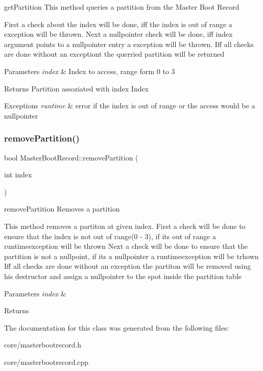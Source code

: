 get\+Partition This method queries a partition from the Master Boot Record 

First a check about the index will be done, iff the index is out of range a exception will be thrown. Next a nullpointer check will be done, iff index argument points to a nullpointer entry a exception will be thrown. Iff all checks are done without an exceptiont the querried partition will be returned 
\begin{DoxyParams}{Parameters}
{\em index} & Index to access, range form 0 to 3 \\
\hline
\end{DoxyParams}
\begin{DoxyReturn}{Returns}
Partition assoziated with index Index 
\end{DoxyReturn}

\begin{DoxyExceptions}{Exceptions}
{\em runtime} & error if the index is out of range or the access would be a nullpointer \\
\hline
\end{DoxyExceptions}
\mbox{\label{classcore_1_1disk_1_1_master_boot_record_af155df4b9738c217678a8f875e679c50}} 
\subsubsection{\texorpdfstring{remove\+Partition()}{removePartition()}}
{\footnotesize\ttfamily bool Master\+Boot\+Record\+::remove\+Partition (\begin{DoxyParamCaption}\item[{int}]{index }\end{DoxyParamCaption})}



remove\+Partition Removes a partition 

This method removes a partiton at given index. First a check will be done to ensure that the index is not out of range(0 -\/ 3), if its out of range a runtimeexception will be thrown Next a check will be done to ensure that the partition is not a nullpoint, if its a nullpointer a runtimeexception will be trhown Iff all checks are done without an exception the partiton will be removed using his destructor and assign a nullpointer to the spot inside the partition table 
\begin{DoxyParams}{Parameters}
{\em index} & \\
\hline
\end{DoxyParams}
\begin{DoxyReturn}{Returns}

\end{DoxyReturn}


The documentation for this class was generated from the following files\+:\begin{DoxyCompactItemize}
\item 
core/masterbootrecord.\+h\item 
core/masterbootrecord.\+cpp\end{DoxyCompactItemize}
